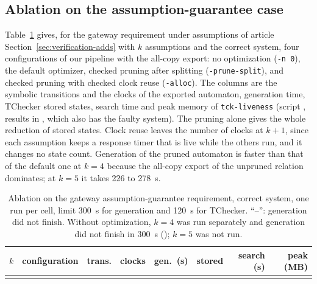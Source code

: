 \subsection{Ablation on the assumption-guarantee case}\label{sec:ag-ablation}
Table~\ref{tab:ag-ablation} gives, for the gateway requirement under assumptions of article Section~\ref{sec:verification-adds} with $k$ assumptions and the correct system, four configurations of our pipeline with the all-copy export: no optimization (\texttt{-n 0}), the default optimizer, checked pruning after splitting (\texttt{-prune-split}), and checked pruning with checked clock reuse (\texttt{-alloc}). The columns are the symbolic transitions and the clocks of the exported automaton, generation time, TChecker stored states, search time and peak memory of \texttt{tck-liveness} (script , results in , which also has the faulty system). The pruning alone gives the whole reduction of stored states. Clock reuse leaves the number of clocks at $k+1$, since each assumption keeps a response timer that is live while the others run, and it changes no state count. Generation of the pruned automaton is faster than that of the default one at $k=4$ because the all-copy export of the unpruned relation dominates; at $k=5$ it takes 226 to 278~s.
\begin{table}[tp]
\centering
\caption{Ablation on the gateway assumption-guarantee requirement, correct system, one run per cell, limit 300~s for generation and 120~s for TChecker. ``--'': generation did not finish. Without optimization, $k=4$ was run separately and generation did not finish in 300~s (); $k=5$ was not run.}
\label{tab:ag-ablation}
\small
\begin{tabular}{rlrrrrrr}
\toprule
$k$ & configuration & trans. & clocks & gen.\ (s) & stored & search (s) & peak (MB)\\
\midrule
\\
\bottomrule
\end{tabular}
\end{table}

